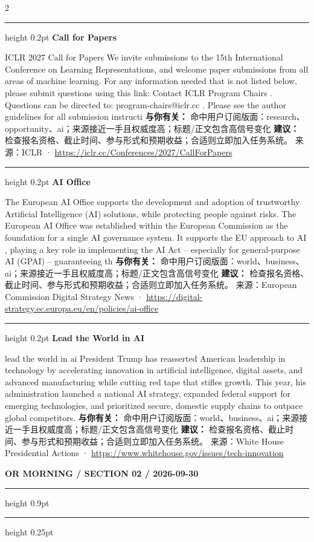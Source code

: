\documentclass[10.5pt]{ctexart}
\begin{document}
\begin{multicols}{2}
\vspace{2mm}
\hrule height 0.2pt
\vspace{2mm}
{\large\bfseries Call for Papers}\par
ICLR 2027 Call for Papers We invite submissions to the 15th International Conference on Learning Representations, and welcome paper submissions from all areas of machine learning. For any information needed that is not listed below, please submit questions using this link: Contact ICLR Program Chairs . Questions can be directed to: program-chairs@iclr.cc . Please see the author guidelines for all submission instructi
\textbf{与你有关：} 命中用户订阅版面：research、opportunity、ai；来源接近一手且权威度高；标题/正文包含高信号变化
\textbf{建议：} 检查报名资格、截止时间、参与形式和预期收益；合适则立即加入任务系统。
{\footnotesize\color{ormuted} 来源：ICLR · \url{https://iclr.cc/Conferences/2027/CallForPapers}}
\vspace{2mm}
\hrule height 0.2pt
\vspace{2mm}
{\large\bfseries AI Office}\par
The European AI Office supports the development and adoption of trustworthy Artificial Intelligence (AI) solutions, while protecting people against risks. The European AI Office was established within the European Commission as the foundation for a single AI governance system. It supports the EU approach to AI , playing a key role in implementing the AI Act – especially for general-purpose AI (GPAI) – guaranteeing th
\textbf{与你有关：} 命中用户订阅版面：world、business、ai；来源接近一手且权威度高；标题/正文包含高信号变化
\textbf{建议：} 检查报名资格、截止时间、参与形式和预期收益；合适则立即加入任务系统。
{\footnotesize\color{ormuted} 来源：European Commission Digital Strategy News · \url{https://digital-strategy.ec.europa.eu/en/policies/ai-office}}
\vspace{2mm}
\hrule height 0.2pt
\vspace{2mm}
{\large\bfseries Lead the World in AI}\par
lead the world in ai President Trump has reasserted American leadership in technology by accelerating innovation in artificial intelligence, digital assets, and advanced manufacturing while cutting red tape that stifles growth. This year, his administration launched a national AI strategy, expanded federal support for emerging technologies, and prioritized secure, domestic supply chains to outpace global competitors.
\textbf{与你有关：} 命中用户订阅版面：world、business、ai；来源接近一手且权威度高；标题/正文包含高信号变化
\textbf{建议：} 检查报名资格、截止时间、参与形式和预期收益；合适则立即加入任务系统。
{\footnotesize\color{ormuted} 来源：White House Presidential Actions · \url{https://www.whitehouse.gov/issues/tech-innovation}}
\end{multicols}
\newpage
{\small\bfseries OR MORNING / SECTION 02 / 2026-09-30}
\vspace{2mm}
\hrule height 0.9pt
\vspace{1.5mm}
\hrule height 0.25pt
\vspace{4mm}
\end{document}
